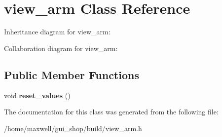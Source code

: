 \hypertarget{classview__arm}{}\section{view\+\_\+arm Class Reference}
\label{classview__arm}


Inheritance diagram for view\+\_\+arm\+:


Collaboration diagram for view\+\_\+arm\+:
\subsection*{Public Member Functions}
\begin{DoxyCompactItemize}
\item 
void {\bfseries reset\+\_\+values} ()\hypertarget{classview__arm_a123f6e7d76d9a434d9031ec67c1908ed}{}\label{classview__arm_a123f6e7d76d9a434d9031ec67c1908ed}

\end{DoxyCompactItemize}


The documentation for this class was generated from the following file\+:\begin{DoxyCompactItemize}
\item 
/home/maxwell/gui\+\_\+shop/build/view\+\_\+arm.\+h\end{DoxyCompactItemize}
